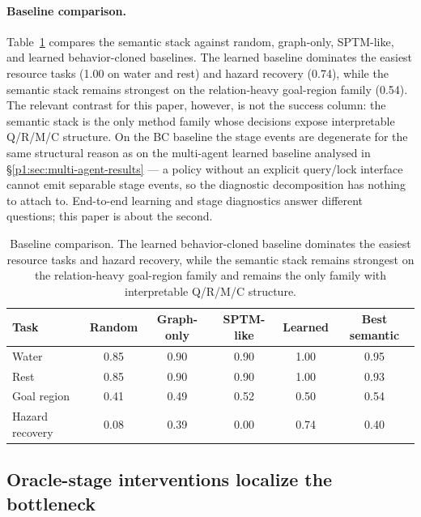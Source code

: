 \documentclass{article}
\begin{document}
\paragraph{Baseline comparison.}
Table~\ref{p1:tab:baselines} compares the semantic stack against random,
graph-only, SPTM-like, and learned behavior-cloned baselines. The
learned baseline dominates the easiest resource tasks (1.00 on water
and rest) and hazard recovery (0.74), while the semantic stack remains
strongest on the relation-heavy goal-region family (0.54). The
relevant contrast for this paper, however, is not the success column:
the semantic stack is the only method family whose decisions expose
interpretable Q/R/M/C structure. On the BC baseline the stage events
are degenerate for the same structural reason as on the multi-agent
learned baseline analysed in \S\ref{p1:sec:multi-agent-results} --- a
policy without an explicit query/lock interface cannot emit separable
stage events, so the diagnostic decomposition has nothing to attach
to. End-to-end learning and stage diagnostics answer different
questions; this paper is about the second.

\begin{table}[t]
  \caption{Baseline comparison. The learned behavior-cloned baseline dominates the easiest resource tasks and hazard recovery, while the semantic stack remains strongest on the relation-heavy goal-region family and remains the only family with interpretable Q/R/M/C structure.}
  \label{p1:tab:baselines}
  \centering
  \small
  \begin{tabular}{p{1.9cm}c c c c c}
    \toprule
    Task & Random & Graph-only & SPTM-like & Learned & Best semantic \\
    \midrule
    Water & 0.85 & 0.90 & 0.90 & 1.00 & 0.95 \\
    Rest & 0.85 & 0.90 & 0.90 & 1.00 & 0.93 \\
    Goal region & 0.41 & 0.49 & 0.52 & 0.50 & 0.54 \\
    Hazard recovery & 0.08 & 0.39 & 0.00 & 0.74 & 0.40 \\
    \bottomrule
  \end{tabular}
\end{table}

\subsection{Oracle-stage interventions localize the bottleneck}
\label{p1:sec:oracle}
\end{document}
